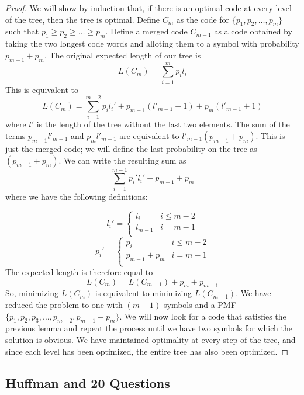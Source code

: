 \documentclass[11pt]{article}
\theoremstyle{definition}
\begin{document}
\begin{proof} We will show by induction that, if there is an optimal code at every level of the tree, then the tree is optimal. Define $C_m$ as the code for $\{p_1, p_2, \dots, p_m \}$ such that $p_1 \geq p_2 \geq \dots \geq p_m$. Define a merged code $C_{m-1}$ as a code obtained by taking the two longest code words and alloting them to a symbol with probability $p_{m-1} + p_m$. The original expected length of our tree is $$L(C_m) = \sum_{i = 1}^m p_i l_i$$This is equivalent to $$L(C_m) = \sum_{i-1}^{m-2} p_i l_i' + p_{m-1}(l'_{m-1} + 1) + p_m (l'_{m-1} + 1)$$where $l'$ is the length of the tree without the last two elements. The sum of the terms $p_{m-1}l'_{m-1}$ and $p_m l'_{m-1}$ are equivalent to $l'_{m-1}(p_{m-1} + p_m)$. This is just the merged code; we will define the last probability on the tree as $(p_{m-1} + p_m)$. We can write the resulting sum as $$\sum_{i = 1}^{m - 1}p_i' l_i' + p_{m-1} + p_m$$where we have the following definitions:

\begin{equation*}
l_i' = \begin{cases}
l_i &i \leq m-2\\
l_{m-1} & i = m-1\\
\end{cases}
\end{equation*} 
\begin{equation*}
p_i' = \begin{cases}
p_i &i \leq m-2\\
p_{m-1} + p_{m}& i = m-1\\
\end{cases}
\end{equation*}
The expected length is therefore equal to $$L(C_m) = L(C_{m-1}) + p_m + p_{m-1}$$So, minimizing $L(C_m)$ is equivalent to minimizing $L(C_{m-1})$. We have reduced the problem to one with $(m-1)$ symbols and a PMF $\{p_1, p_2, p_3, \dots, p_{m-2}, p_{m-1} + p_m \}$. We will now look for a code that satisfies the previous lemma and repeat the process until we have two symbols for which the solution is obvious. We have maintained optimality at every step of the tree, and since each level has been optimized, the entire tree has also been optimized. 
\end{proof}

\subsection{Huffman and 20 Questions}
\end{document}
